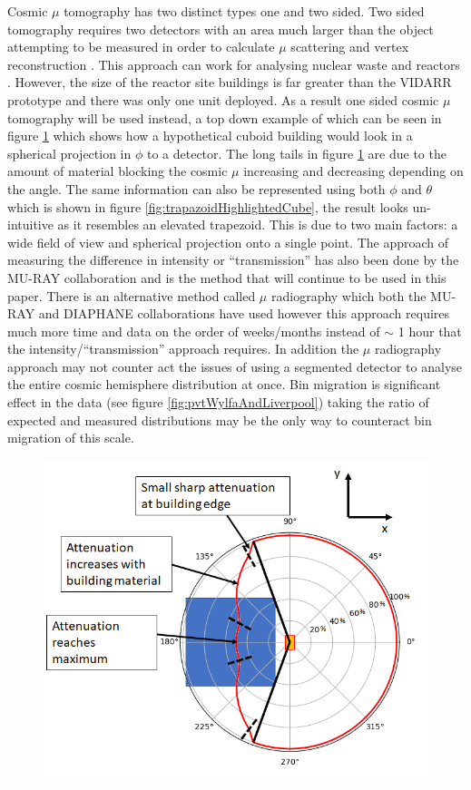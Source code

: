 \documentclass[12pt,a4paper]{article}
\begin{document}
Cosmic $\mu$ tomography has two distinct types one and two sided. Two sided tomography requires two detectors with an area much larger than the object attempting to be measured in order to calculate $\mu$ scattering and vertex reconstruction \cite{schultz_2007}. This approach can work for analysing nuclear waste \cite{Jonkmans_2013} and reactors \cite{miyadera2013imaging}. However, the size of the reactor site buildings is far greater than the VIDARR prototype and there was only one unit deployed. As a result one sided cosmic $\mu$ tomography will be used instead, a top down example of which can be seen in figure \ref{fig:oneSidedMuTomography} which shows how a hypothetical cuboid building would look in a spherical projection in $\phi$ to a detector. The long tails in figure \ref{fig:oneSidedMuTomography} are due to the amount of material blocking the cosmic $\mu$ increasing and decreasing depending on the angle. The same information can also be represented using both $\phi$ and $\theta$ which is shown in figure \ref{fig:trapazoidHighlightedCube}, the result looks un-intuitive as it resembles an elevated trapezoid. This is due to two main factors: a wide field of view and spherical projection onto a single point. The approach of measuring the difference in intensity or ``transmission'' has also been done by the MU-RAY collaboration \cite{Ambrosino_2014} and is the method that will continue to be used in this paper. There is an alternative method called $\mu$ radiography which both the MU-RAY and DIAPHANE collaborations have used \cite{Marteau_2017} \cite{Ambrosino_2014} however this approach requires much more time and data on the order of weeks/months instead of $\sim$ 1 hour that the intensity/``transmission'' approach requires. In addition the $\mu$ radiography approach may not counter act the issues of using a segmented detector to analyse the entire cosmic hemisphere distribution at once. Bin migration is significant effect in the data (see figure \ref{fig:pvtWylfaAndLiverpool}) taking the ratio of expected and measured distributions may be the only way to counteract bin migration of this scale. 

\begin{figure}[H]
 \centering
 \includegraphics[width=0.6\linewidth]{CubeAttenuationTopDownPaper.png}
 \label{fig:oneSidedMuTomography}
\end{figure}
\end{document}
